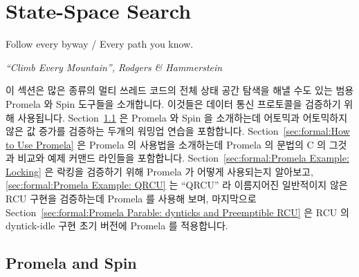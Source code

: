 
\section{State-Space Search}
\label{sec:formal:State-Space Search}
%
\epigraph{Follow every byway / Every path you know.}
	 {\emph{``Climb Every Mountain'', Rodgers \& Hammerstein}}

이 섹션은 많은 종류의 멀티 쓰레드 코드의 전체 상태 공간 탐색을 해낼 수도 있는
범용 Promela 와 Spin 도구들을 소개합니다.
이것들은 데이터 통신 프로토콜을 검증하기 위해 사용됩니다.
Section~\ref{sec:formal:Promela and Spin}
은 Promela 와 Spin 을 소개하는데 어토믹과 어토믹하지 않은 값 증가를 검증하는
두개의 워밍업 연습을 포함합니다.
Section~\ref{sec:formal:How to Use Promela}
은 Promela 의 사용법을 소개하는데 Promela 의 문법의 C 의 그것과 비교와 예제
커맨드 라인들을 포함합니다.
Section~\ref{sec:formal:Promela Example: Locking}
은 락킹을 검증하기 위해 Promela 가 어떻게 사용되는지 알아보고,
\ref{sec:formal:Promela Example: QRCU}
는 ``QRCU'' 라 이름지어진 일반적이지 않은 RCU 구현을 검증하는데 Promela 를
사용해 보며, 마지막으로
Section~\ref{sec:formal:Promela Parable: dynticks and Preemptible RCU}
은 RCU 의 dyntick-idle 구현 초기 버전에 Promela 를 적용합니다.

\iffalse

This section features the general-purpose Promela and Spin tools,
which may be used to carry out a full
state-space search of many types of multi-threaded code.
They are used to verifying data communication protocols.
Section~\ref{sec:formal:Promela and Spin}
introduces Promela and Spin, including a couple of warm-up exercises
verifying both non-atomic and atomic increment.
Section~\ref{sec:formal:How to Use Promela}
describes use of Promela, including example command lines and a
comparison of Promela syntax to that of C\@.
Section~\ref{sec:formal:Promela Example: Locking}
shows how Promela may be used to verify locking,
\ref{sec:formal:Promela Example: QRCU}
uses Promela to verify an unusual implementation of RCU named ``QRCU'',
and finally
Section~\ref{sec:formal:Promela Parable: dynticks and Preemptible RCU}
applies Promela to early versions of RCU's dyntick-idle implementation.

\fi

\subsection{Promela and Spin}
\label{sec:formal:Promela and Spin}

